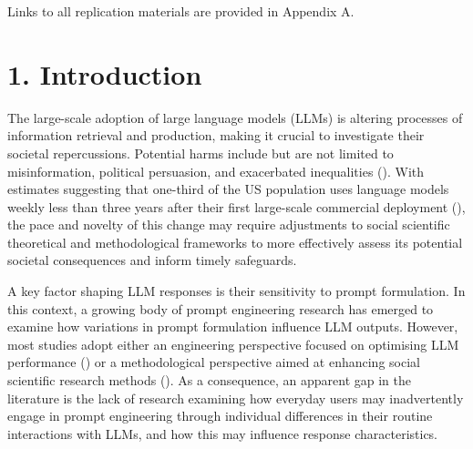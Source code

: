 \documentclass[
  12pt,
]{article}
\begin{document}
\begin{center}
Links to all replication materials are provided in Appendix A.
\end{center}

\clearpage

\section{1. Introduction}\label{introduction}

The large-scale adoption of large language models (LLMs) is altering processes of information retrieval and production, making it crucial to investigate their societal repercussions. Potential harms include but are not limited to misinformation, political persuasion, and exacerbated inequalities (). With estimates suggesting that one-third of the US population uses language models weekly less than three years after their first large-scale commercial deployment (), the pace and novelty of this change may require adjustments to social scientific theoretical and methodological frameworks to more effectively assess its potential societal consequences and inform timely safeguards.

A key factor shaping LLM responses is their sensitivity to prompt formulation. In this context, a growing body of prompt engineering research has emerged to examine how variations in prompt formulation influence LLM outputs. However, most studies adopt either an engineering perspective focused on optimising LLM performance () or a methodological perspective aimed at enhancing social scientific research methods (). As a consequence, an apparent gap in the literature is the lack of research examining how everyday users may inadvertently engage in prompt engineering through individual differences in their routine interactions with LLMs, and how this may influence response characteristics.
\end{document}

